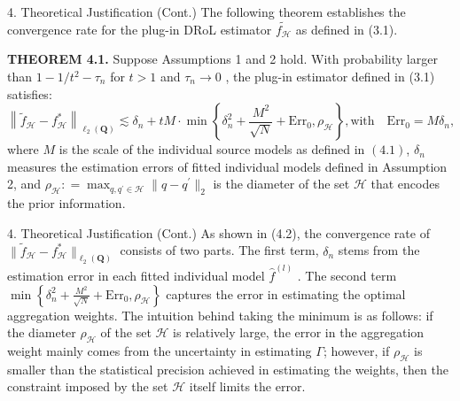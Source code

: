 \documentclass{beamer}
\begin{document}
\begin{frame}{4. Theoretical Justification (Cont.)}
    The following theorem establishes the convergence rate for the plug-in DRoL estimator $\widetilde { f _ { \mathcal { H } } }$ as defined in (3.1).
    
    \textbf{THEOREM 4.1.} Suppose Assumptions 1 and 2 hold. With probability larger than $1 - 1 / t ^ { 2 } - \tau _ { n }$ for $t > 1$ and $\tau _ { n } \to 0$ , the plug-in estimator defined in (3.1) satisfies:
    $$
    \left\| \widetilde {f} _ {\mathcal {H}} - f _ {\mathcal {H}} ^ {*} \right\| _ {\ell_ {2} (\mathbf {Q})} \lesssim \delta_ {n} + t M \cdot \min \left\{\delta_ {n} ^ {2} + \frac {M ^ {2}}{\sqrt {N}} + \mathrm{Err} _ {0},   \rho_ {\mathcal {H}} \right\},   \text{with} \quad \mathrm{Err} _ {0} = M \delta_ {n}, 
    $$
    where $M$ is the scale of the individual source models as defined in $(4.1)$, $\delta _ { n }$ measures the estimation errors of fitted individual models defined in Assumption 2, and $\rho _ { \mathcal { H } } : = \operatorname* { m a x } _ { q , q ^ { \prime } \in \mathcal { H } } \| q - q ^ { \prime } \| _ { 2 }$ is the diameter of the set $\mathcal{H}$ that encodes the prior information.
\end{frame}

\begin{frame}{4. Theoretical Justification (Cont.)}
    As shown in (4.2), the convergence rate of $\| \widetilde { f } _ { \mathcal { H } } - f _ { \mathcal { H } } ^ { * } \| _ { \ell _ { 2 } ( \mathbf { Q } ) }$ consists of two parts. The first term, $\delta _ { n }$ stems from the estimation error in each fitted individual model ${ \widehat { f } } ^ { ( l ) }$ . The second term $\min \left\{\delta_ {n} ^ {2} + \frac {M ^ {2}}{\sqrt {N}} + \mathrm{Err} _ {0}, \rho_ {\mathcal {H}} \right\}$ captures the error in estimating the optimal aggregation weights. The intuition behind taking the minimum is as follows: if the diameter $\rho_{\mathcal{H}}$ of the set $\mathcal{H}$ is relatively large, the error in the aggregation weight mainly comes from the uncertainty in estimating $\Gamma$; however, if $\rho_{\mathcal{H}}$ is smaller than the statistical precision achieved in estimating the weights, then the constraint imposed by the set $\mathcal{H}$ itself limits the error.
\end{frame}
\end{document}
